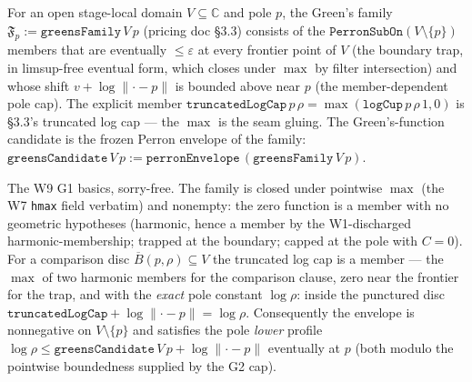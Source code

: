 \begin{definition}
\label{def:perron-greens-family}
For an open stage-local domain \(V \subseteq \mathbb{C}\) and pole
\(p\), the Green's family \(\mathfrak{F}_p := \texttt{greensFamily}\,V\,p\)
(pricing doc §3.3) consists of the \(\texttt{PerronSubOn}(V \setminus \{p\})\)
members that are eventually \(\le \varepsilon\) at every frontier point
of \(V\) (the boundary trap, in limsup-free eventual form, which closes
under \(\max\) by filter intersection) and whose shift
\(v + \log\lVert\cdot - p\rVert\) is bounded above near \(p\) (the
member-dependent pole cap).  The explicit member
\(\texttt{truncatedLogCap}\,p\,\rho = \max(\texttt{logCup}\,p\,\rho\,1, 0)\)
is §3.3's truncated log cap — the \(\max\) is the seam gluing.  The
Green's-function candidate is the frozen Perron envelope of the family:
\(\texttt{greensCandidate}\,V\,p := \texttt{perronEnvelope}\,(\texttt{greensFamily}\,V\,p)\).
\leanok
\end{definition}

\begin{lemma}
\label{lem:perron-greens-family-basics}
The W9 G1 basics, sorry-free.  The family is closed under pointwise
\(\max\) (the W7 \texttt{hmax} field verbatim) and nonempty: the zero
function is a member with no geometric hypotheses (harmonic, hence a
member by the W1-discharged harmonic-membership; trapped at the
boundary; capped at the pole with \(C = 0\)).  For a comparison disc
\(\overline{B}(p, \rho) \subseteq V\) the truncated log cap is a member
— the \(\max\) of two harmonic members for the comparison clause, zero
near the frontier for the trap, and with the \emph{exact} pole constant
\(\log\rho\): inside the punctured disc
\(\texttt{truncatedLogCap} + \log\lVert\cdot - p\rVert = \log\rho\).
Consequently the envelope is nonnegative on \(V \setminus \{p\}\) and
satisfies the pole \emph{lower} profile
\(\log\rho \le \texttt{greensCandidate}\,V\,p + \log\lVert\cdot - p\rVert\)
eventually at \(p\) (both modulo the pointwise boundedness supplied by
the G2 cap).
\leanok
\end{lemma}

